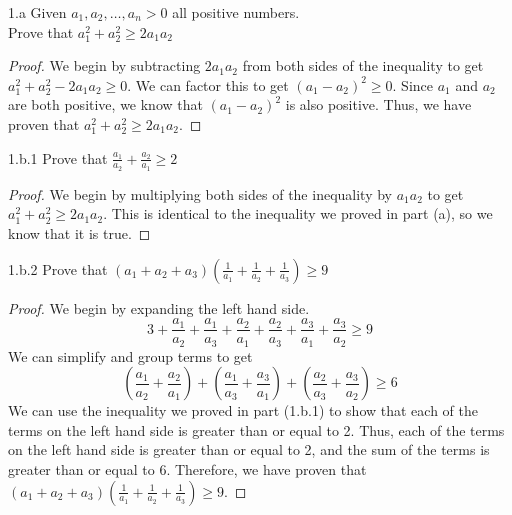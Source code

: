 \documentclass[boxes,sansserif]{rutgers_hw}
\author{Rohan Karamel} %
\date{\today} %
\begin{document}
\maketitle


\begin{exern}{1.a} 
  Given $a_1, a_2, \dots, a_n > 0$ all positive numbers. \\ Prove that $a^2_1 + a^2_2 \ge 2a_1a_2$
\end{exern}

\begin{proof} 
  We begin by subtracting $2a_1a_2$ from both sides of the inequality to get $a^2_1 + a^2_2 - 2a_1a_2 \ge 0$. 
  We can factor this to get ${(a_1 - a_2)}^2 \ge 0$. 
  Since $a_1$ and $a_2$ are both positive, we know that ${(a_1 - a_2)}^2$ is also positive. 
  Thus, we have proven that $a^2_1 + a^2_2 \ge 2a_1a_2$.
\end{proof}


\begin{exern}{1.b.1} 
    Prove that $\frac{a_1}{a_2} + \frac{a_2}{a_1} \ge 2$
\end{exern}

\begin{proof} 
    We begin by multiplying both sides of the inequality by $a_1a_2$ to get $a^2_1 + a^2_2 \ge 2a_1a_2$. 
    This is identical to the inequality we proved in part (a), so we know that it is true.
\end{proof}


\begin{exern}{1.b.2}
    Prove that ${(a_1 + a_2 + a_3)}{(\frac{1}{a_1} + \frac{1}{a_2} + \frac{1}{a_3})} \ge 9$
\end{exern}

\begin{proof}
    We begin by expanding the left hand side.
    \[ 3 + \frac{a_1}{a_2} + \frac{a_1}{a_3} + \frac{a_2}{a_1} + \frac{a_2}{a_3} + \frac{a_3}{a_1} + \frac{a_3}{a_2} \ge 9\]
    We can simplify and group terms to get
    \[ {(\frac{a_1}{a_2} + \frac{a_2}{a_1})} + {(\frac{a_1}{a_3} + \frac{a_3}{a_1})} + {(\frac{a_2}{a_3} + \frac{a_3}{a_2})} \ge 6\]
    We can use the inequality we proved in part (1.b.1) to show that each of the terms on the left hand side is greater than or equal to 2. 
    Thus, each of the terms on the left hand side is greater than or equal to 2, and the sum of the terms is greater than or equal to 6.
    Therefore, we have proven that ${(a_1 + a_2 + a_3)}{(\frac{1}{a_1} + \frac{1}{a_2} + \frac{1}{a_3})} \ge 9$.
\end{proof}
\end{document}
